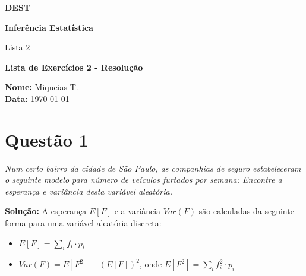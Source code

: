 \documentclass[12pt, a4paper]{article}
\begin{document}
\begin{titlepage}
    \centering


    {\Huge \textbf{DEST}}\par

    \vspace{2cm}

    {\Large \textbf{Inferência Estatística}} \par
    {\Large Lista 2 } \par

    \vspace{2.5cm}

    {\Large \textbf{Lista de Exercícios 2 - Resolução}}

    \vfill %

    \large
    \begin{flushleft}
    \textbf{Nome:} Miqueias T. \\
    \textbf{Data:} \today
    \end{flushleft}
\end{titlepage}


\section*{Questão 1}
\textit{Num certo bairro da cidade de São Paulo, as companhias de seguro estabeleceram o seguinte modelo para número de veículos furtados por semana: Encontre a esperança e variância desta variável aleatória.}

\textbf{Solução:}
A esperança $E[F]$ e a variância $Var(F)$ são calculadas da seguinte forma para uma variável aleatória discreta:
\begin{itemize}
    \item $E[F] = \sum_{i} f_i \cdot p_i$
    \item $Var(F) = E[F^2] - (E[F])^2$, onde $E[F^2] = \sum_{i} f_i^2 \cdot p_i$
\end{itemize}
\end{document}
